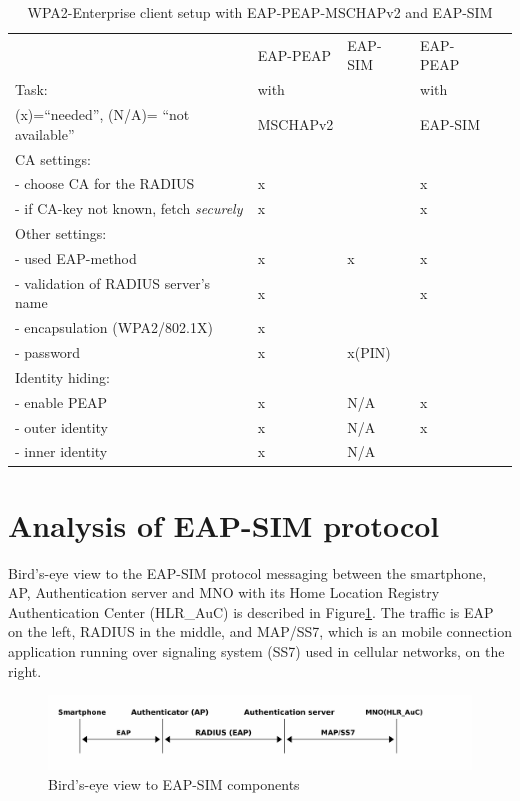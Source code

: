 \documentclass[12pt,a4paper,english]{tutthesis}
\begin{document}
\begin{otherlanguage}{english}
\begin{table}[htb]
\caption{\label{table-peapsim}WPA2-Enterprise client setup with EAP-PEAP-MSCHAPv2 and EAP-SIM}
\centering
\begin{tabular}{|l|l|l|ll|}
\hline
 & EAP-PEAP & EAP-SIM & EAP-PEAP & \\
Task: & with &  & with & \\
(x)=``needed'', (N/A)= ``not available'' & MSCHAPv2 &  & EAP-SIM & \\
\hline
CA settings: &  &  &  & \\
- choose CA for the RADIUS & x &  & x & \\
- if CA-key not known, fetch \emph{securely} & x &  & x & \\
\hline
Other settings: &  &  &  & \\
- used EAP-method & x & x & x & \\
- validation of RADIUS server's name & x &  & x & \\
- encapsulation (WPA2/802.1X) & x &  &  & \\
- password & x & x(PIN) &  & \\
\hline
Identity hiding: &  &  &  & \\
- enable PEAP & x & N/A & x & \\
- outer identity & x & N/A & x & \\
- inner identity & x & N/A &  & \\
\hline
\end{tabular}
\end{table}

\section{Analysis of EAP-SIM protocol}
\label{sec-2-6}
Bird's-eye view to the EAP-SIM protocol messaging between the
smartphone, AP, Authentication server and MNO with its Home Location
Registry Authentication Center (HLR\_AuC) is described in
Figure\ref{fig:eap-sim-bird}.  The traffic is EAP on the left, RADIUS in the
middle, and MAP/SS7, which is an mobile connection application running
over signaling system (SS7) used in cellular networks, on the right.


\begin{figure}[htb]
\centering
\includegraphics[width=.9\linewidth]{eap-sim-bird.png}
\caption{\label{fig:eap-sim-bird}Bird's-eye view to EAP-SIM components}
\end{figure}






\end{otherlanguage}
\end{document}
